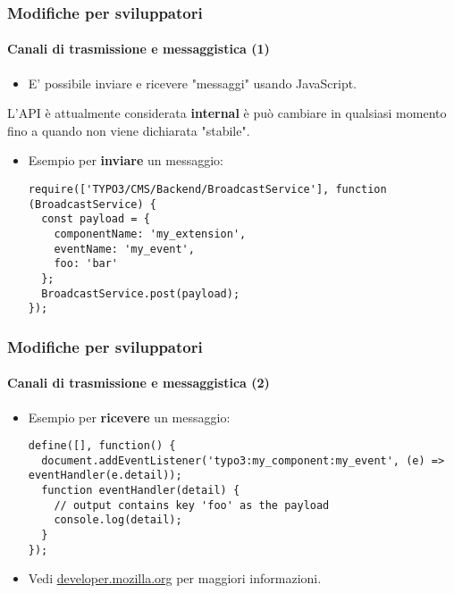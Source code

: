 \begin{frame}[fragile]
	\frametitle{Modifiche per sviluppatori}
	\framesubtitle{Canali di trasmissione e messaggistica (1)}

	\lstset{basicstyle=\tiny\ttfamily}

	\begin{itemize}
		\item E' possibile inviare e ricevere "messaggi" usando JavaScript.
	\end{itemize}

	\vspace{-0.2cm}
	\begingroup
		\color{red}
			\begin{center}
				L'API è attualmente considerata \textbf{internal} è può cambiare\newline
				in qualsiasi momento fino a quando non viene dichiarata "stabile".
			\end{center}
	\endgroup

	\begin{itemize}
		\item Esempio per \textbf{inviare} un messaggio:

\begin{lstlisting}
require(['TYPO3/CMS/Backend/BroadcastService'], function (BroadcastService) {
  const payload = {
    componentName: 'my_extension',
    eventName: 'my_event',
    foo: 'bar'
  };
  BroadcastService.post(payload);
});
\end{lstlisting}

	\end{itemize}

\end{frame}


\begin{frame}[fragile]
	\frametitle{Modifiche per sviluppatori}
	\framesubtitle{Canali di trasmissione e messaggistica (2)}

	\lstset{basicstyle=\tiny\ttfamily}

	\begin{itemize}
		\item Esempio per \textbf{ricevere} un messaggio:

\begin{lstlisting}
define([], function() {
  document.addEventListener('typo3:my_component:my_event', (e) => eventHandler(e.detail));
  function eventHandler(detail) {
    // output contains key 'foo' as the payload
    console.log(detail);
  }
});
\end{lstlisting}

		\item Vedi \href{https://developer.mozilla.org/en-US/docs/Web/API/Broadcast_Channel_API}{developer.mozilla.org} per maggiori informazioni.

	\end{itemize}

\end{frame}

